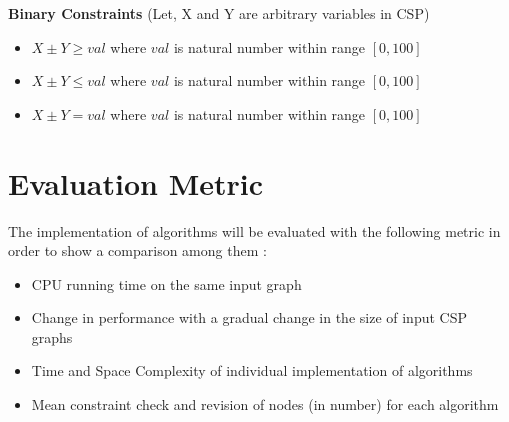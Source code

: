 \documentclass[a4paper]{article}
\begin{document}
\textbf{Binary Constraints} (Let, X and Y are arbitrary variables in CSP)
\begin{itemize} 
	\item $ X \pm Y \geq val$ where $ val $ is natural number within range $ [0, 100] $
	\item $ X \pm Y \leq val$ where $ val $ is natural number within range $ [0, 100] $
	\item $ X \pm Y = val$ where $ val $ is natural number within range $ [0, 100] $ 
\end{itemize}

\section*{Evaluation Metric}
The implementation of algorithms will be evaluated with the following metric in order to show a comparison among them :
\begin{itemize}
	\item CPU running time on the same input graph
	\item Change in performance with a gradual change in the size of input CSP graphs
	\item Time and Space Complexity of individual implementation of algorithms
	\item Mean constraint check and revision of nodes (in number) for each algorithm
\end{itemize}
\end{document}
